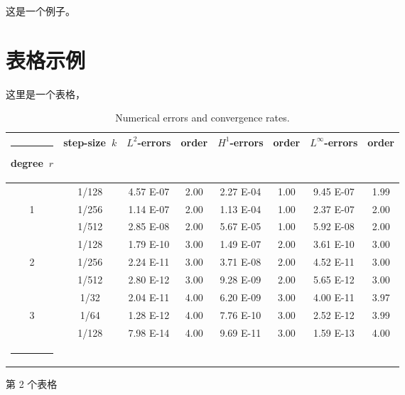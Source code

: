 \documentclass{shnuthesis}
\begin{document}
\begin{example}
这是一个例子。
\end{example}

\clearpage
\section{表格示例}

这里是一个表格，

\begin{table}[!htp]
\footnotesize
\centering
\renewcommand\arraystretch{1.2} %
\makeatletter
\def\hlinew#1{\noalign{\ifnum0=`}\fi\hrule \@height #1 \futurelet\reserved@a\@xhline}
\makeatother
\caption{Numerical errors and convergence rates.}
\vspace{1ex}
\label{table1}
\begin{tabular}{c|c|cc|cc|cc}
\hlinew{0.9pt}  %
degree~$r$ &  step-size~$k$  & $L^2$-errors  &  order  & $H^1$-errors & order & $L^\infty$-errors  &  order \\
\hline
   &  1/128     & 4.57 E-07    &2.00     & 2.27 E-04  &1.00          & 9.45 E-07   &1.99    \\
1  &  1/256    & 1.14 E-07     &2.00    & 1.13 E-04  &1.00          & 2.37 E-07   &2.00      \\
   &  1/512    & 2.85 E-08     &2.00    & 5.67 E-05  &1.00          & 5.92 E-08   &2.00       \\
\hline  %
   &  1/128    & 1.79 E-10    &3.00      & 1.49 E-07  &2.00            & 3.61 E-10  &3.00       \\
2  &  1/256     & 2.24 E-11     &3.00       & 3.71 E-08  &2.00         & 4.52 E-11   &3.00      \\
   &  1/512     & 2.80 E-12     &3.00       & 9.28 E-09  &2.00        & 5.65 E-12   &3.00     \\
\hline  %
   &  1/32      & 2.04 E-11    &4.00      & 6.20 E-09  &3.00           & 4.00 E-11   &3.97       \\
3  &  1/64     & 1.28 E-12     &4.00     & 7.76 E-10  &3.00           & 2.52 E-12   &3.99       \\
   &  1/128     & 7.98 E-14     &4.00     & 9.69 E-11  &3.00           & 1.59 E-13   &4.00       \\
\hlinew{0.9pt}
\end{tabular}
\end{table}

第 2 个表格
\end{document}
